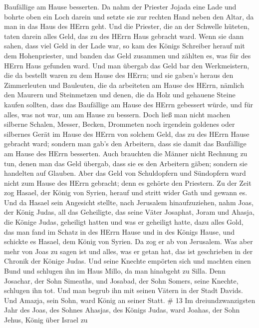 Baufällige am Hause besserten.  Da nahm der Priester Jojada
eine Lade und bohrte oben ein Loch darein und setzte sie zur rechten
Hand neben den Altar, da man in das Haus des HErrn geht. Und die
Priester, die an der Schwelle hüteten, taten darein alles Geld, das zu
des HErrn Haus gebracht ward.  Wenn sie dann sahen, dass
viel Geld in der Lade war, so kam des Königs Schreiber herauf mit dem
Hohenpriester, und banden das Geld zusammen und zählten es, was für des
HErrn Haus gefunden ward.  Und man übergab das Geld bar den
Werkmeistern, die da bestellt waren zu dem Hause des HErrn; und sie
gaben's heraus den Zimmerleuten und Bauleuten, die da arbeiteten am
Hause des HErrn,  nämlich den Maurern und Steinmetzen und
denen, die da Holz und gehauene Steine kaufen sollten, dass das
Baufällige am Hause des HErrn gebessert würde, und für alles, was not
war, um am Hause zu bessern.  Doch ließ man nicht machen
silberne Schalen, Messer, Becken, Drommeten noch irgendein goldenes oder
silbernes Gerät im Hause des HErrn von solchem Geld, das zu des HErrn
Hause gebracht ward;  sondern man gab's den Arbeitern, dass
sie damit das Baufällige am Hause des HErrn besserten. 
Auch brauchten die Männer nicht Rechnung zu tun, denen man das Geld
übergab, dass sie es den Arbeitern gäben; sondern sie handelten auf
Glauben.  Aber das Geld von Schuldopfern und Sündopfern
ward nicht zum Hause des HErrn gebracht; denn es gehörte den Priestern.
 Zu der Zeit zog Hasael, der König von Syrien, herauf und
stritt wider Gath und gewann es. Und da Hasael sein Angesicht stellte,
nach Jerusalem hinaufzuziehen,  nahm Joas, der König Judas,
all das Geheiligte, das seine Väter Josaphat, Joram und Ahasja, die
Könige Judas, geheiligt hatten und was er geheiligt hatte, dazu alles
Gold, das man fand im Schatz in des HErrn Hause und in des Königs Hause,
und schickte es Hasael, dem König von Syrien. Da zog er ab von
Jerusalem.  Was aber mehr von Joas zu sagen ist und alles,
was er getan hat, das ist geschrieben in der Chronik der Könige Judas.
 Und seine Knechte empörten sich und machten einen Bund und
schlugen ihn im Haus Millo, da man hinabgeht zu Silla. 
Denn Josachar, der Sohn Simeaths, und Josabad, der Sohn Somers, seine
Knechte, schlugen ihn tot. Und man begrub ihn mit seinen Vätern in der
Stadt Davids. Und Amazja, sein Sohn, ward König an seiner Statt. \# 13
 Im dreiundzwanzigsten Jahr des Joas, des Sohnes Ahasjas,
des Königs Judas, ward Joahas, der Sohn Jehus, König über Israel zu
